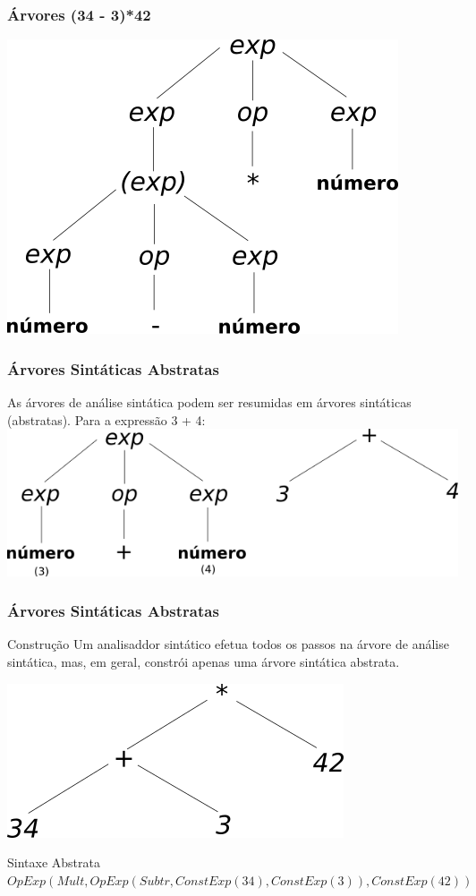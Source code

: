\documentclass[table]{beamer}
\begin{document}
\begin{frame}
   \frametitle{Árvores  (34 - 3)*42}
   \centering
   \includegraphics[scale=0.5]{figuras/quarta_arvore.png}
\end{frame}

\begin{frame}
   \frametitle{Árvores Sintáticas Abstratas}
   As árvores de análise sintática podem ser resumidas em árvores sintáticas (abstratas). Para a expressão 3 + 4: \\
   \vspace{1.0cm}
   \includegraphics[width=\linewidth,height=\textheight,keepaspectratio]{figuras/arvore_abstrata.png}
\end{frame}

\begin{frame}
   \frametitle{Árvores Sintáticas Abstratas}
   \begin{block}{Construção}
   Um analisaddor sintático efetua todos os passos na árvore de análise sintática, mas, em geral, constrói apenas uma árvore sintática abstrata. 
   \end{block}
   \begin{center}
      \includegraphics[scale=0.5]{figuras/segunda_arvore_abstrata.png}
   \end{center}
   \begin{block}{Sintaxe Abstrata}
   $OpExp(Mult, OpExp(Subtr, ConstExp(34), ConstExp(3)), ConstExp(42))$
   \end{block}
\end{frame}
\end{document}
